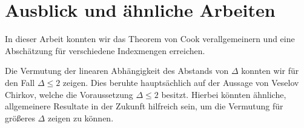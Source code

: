 \section{Ausblick und ähnliche Arbeiten}

In dieser Arbeit konnten wir das Theorem von Cook verallgemeinern und eine Abschätzung für verschiedene Indexmengen erreichen.

Die Vermutung der linearen Abhängigkeit des Abstands von $\Delta$ konnten wir für den Fall $\Delta\leq 2$ zeigen.
Dies beruhte hauptsächlich auf der Aussage von Veselov Chirkov, welche die Voraussetzung $\Delta\leq 2$ besitzt.
Hierbei könnten ähnliche, allgemeinere Resultate in der Zukunft hilfreich sein, um die Vermutung für größeres $\Delta$ zeigen zu können.

